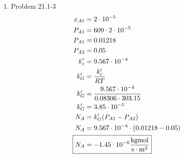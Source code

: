 \documentclass[12pt]{article}
\begin{document}
\begin{enumerate}
\newpage
    \item Problem 21.1-3
    \begin{align*}
        x_{A1} &= 2 \cdot 10^{-5} \\
        P_{A1} &= 609 \cdot 2 \cdot 10^{-5} \\
        P_{A1} &= 0.01218 \\
        P_{A2} &= 0.05 \\
        k'_c &= 9.567 \cdot 10^{-4} \\
        k'_G &= \frac{k'_c}{RT} \\
        k'_G &= \frac{9.567 \cdot 10^{-4}}{0.08306 \cdot 303.15} \\
        k'_G &= 3.85 \cdot 10^{-5} \\
        N_A &= k'_G (P_{A1} - P_{A2}) \\
        N_A &= 9.567 \cdot 10^{-4} \cdot (0.01218 - 0.05) \\
        \Aboxed{N_A &= -1.45 \cdot 10^{-6} \frac{\mathrm{kgmol}}{\mathrm{s}\cdot\mathrm{m}^2} } \\
    \end{align*}



\end{enumerate}
\end{document}
